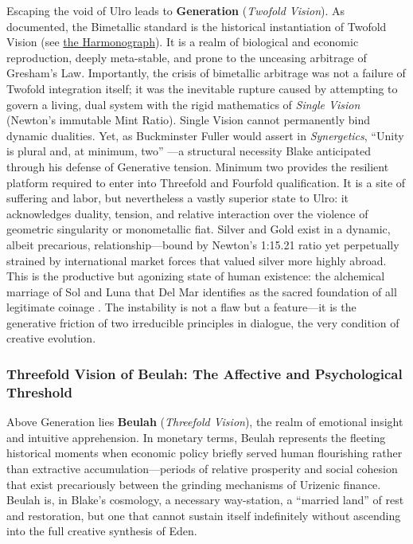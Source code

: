 \documentclass[
]{article}
\begin{document}
Escaping the void of Ulro leads to \textbf{Generation} (\emph{Twofold
Vision}). As documented, the Bimetallic standard is the historical
instantiation of Twofold Vision (see \hyperref[fig-alchemy]{the
Harmonograph}). It is a realm of biological and economic reproduction,
deeply meta-stable, and prone to the unceasing arbitrage of Gresham's
Law. Importantly, the crisis of bimetallic arbitrage was not a failure
of Twofold integration itself; it was the inevitable rupture caused by
attempting to govern a living, dual system with the rigid mathematics of
\emph{Single Vision} (Newton's immutable Mint Ratio). Single Vision
cannot permanently bind dynamic dualities. Yet, as Buckminster Fuller
would assert in \emph{Synergetics}, ``Unity is plural and, at minimum,
two'' \citep{fuller1975synergetics}---a structural necessity Blake
anticipated through his defense of Generative tension. Minimum two
provides the resilient platform required to enter into Threefold and
Fourfold qualification. It is a site of suffering and labor, but
nevertheless a vastly superior state to Ulro: it acknowledges duality,
tension, and relative interaction over the violence of geometric
singularity or monometallic fiat. Silver and Gold exist in a dynamic,
albeit precarious, relationship---bound by Newton's 1:15.21 ratio yet
perpetually strained by international market forces that valued silver
more highly abroad. This is the productive but agonizing state of human
existence: the alchemical marriage of Sol and Luna that Del Mar
identifies as the sacred foundation of all legitimate coinage
\citep{delmar1895history}. The instability is not a flaw but a
feature---it is the generative friction of two irreducible principles in
dialogue, the very condition of creative evolution.

\subsubsection{Threefold Vision of Beulah: The Affective and
Psychological
Threshold}\label{threefold-vision-of-beulah-the-affective-and-psychological-threshold}

Above Generation lies \textbf{Beulah} (\emph{Threefold Vision}), the
realm of emotional insight and intuitive apprehension. In monetary
terms, Beulah represents the fleeting historical moments when economic
policy briefly served human flourishing rather than extractive
accumulation---periods of relative prosperity and social cohesion that
exist precariously between the grinding mechanisms of Urizenic finance.
Beulah is, in Blake's cosmology, a necessary way-station, a ``married
land'' of rest and restoration, but one that cannot sustain itself
indefinitely without ascending into the full creative synthesis of Eden.
\end{document}
